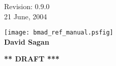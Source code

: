 \thispagestyle{empty}

\begin{flushright}
\large
  Revision: 0.9.0 \\
  21 June, 2004 \\
\end{flushright}

\vfill

{
\begin{center}
\texttt{[image: bmad\_ref\_manual.psfig]} \\
\vskip 0.3in
\huge\bf David Sagan
\end{center}
}

\vskip 1in
\begin{center}
{\Huge \bf *** DRAFT ***}
\end{center}
\vfill
\break